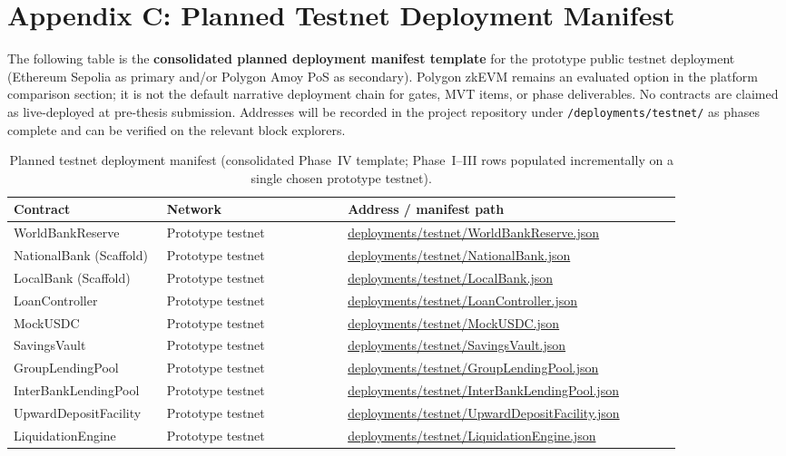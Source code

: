 \documentclass[12pt,a4paper]{report}
\newcommand{\tableheadcolor}{\rowcolor{TableHeadBg}}
\newcommand{\tableheadfont}{\bfseries}
\begin{document}
\chapter*{Appendix C: Planned Testnet Deployment Manifest}
{}

The following table is the \textbf{consolidated planned deployment manifest template} for the prototype public testnet deployment (Ethereum Sepolia as primary and/or Polygon Amoy PoS as secondary). Polygon zkEVM remains an evaluated option in the platform comparison section; it is not the default narrative deployment chain for gates, MVT items, or phase deliverables. No contracts are claimed as live-deployed at pre-thesis submission. Addresses will be recorded in the project repository under \texttt{/deployments/testnet/} as phases complete and can be verified on the relevant block explorers.

\begin{table}[H]
\centering
\caption[Planned testnet deployment manifest]{Planned testnet deployment manifest (consolidated Phase~IV template; Phase~I--III rows populated incrementally on a single chosen prototype testnet).}
\label{tab:cardona-manifest}
\begingroup
\footnotesize
\setlength{\tabcolsep}{4pt}
\renewcommand{\arraystretch}{1.15}
\begin{tabular}{@{}%
  >{\raggedright\arraybackslash}p{0.22\linewidth}%
  >{\raggedright\arraybackslash}p{0.26\linewidth}%
  >{\raggedright\arraybackslash}p{0.48\linewidth}@{}}
\toprule
\tableheadcolor
\tableheadfont Contract & \tableheadfont Network & \tableheadfont Address / manifest path \\
\midrule
WorldBankReserve & Prototype testnet & \url{deployments/testnet/WorldBankReserve.json} \\
\rowcolor{RowShade}
NationalBank (Scaffold) & Prototype testnet & \url{deployments/testnet/NationalBank.json} \\
LocalBank (Scaffold) & Prototype testnet & \url{deployments/testnet/LocalBank.json} \\
\rowcolor{RowShade}
LoanController & Prototype testnet & \url{deployments/testnet/LoanController.json} \\
\rowcolor{RowShade}
MockUSDC & Prototype testnet & \url{deployments/testnet/MockUSDC.json} \\
SavingsVault & Prototype testnet & \url{deployments/testnet/SavingsVault.json} \\
\rowcolor{RowShade}
GroupLendingPool & Prototype testnet & \url{deployments/testnet/GroupLendingPool.json} \\
InterBankLendingPool & Prototype testnet & \url{deployments/testnet/InterBankLendingPool.json} \\
\rowcolor{RowShade}
UpwardDepositFacility & Prototype testnet & \url{deployments/testnet/UpwardDepositFacility.json} \\
LiquidationEngine & Prototype testnet & \url{deployments/testnet/LiquidationEngine.json} \\
\bottomrule
\end{tabular}
\endgroup
\end{table}
\end{document}
